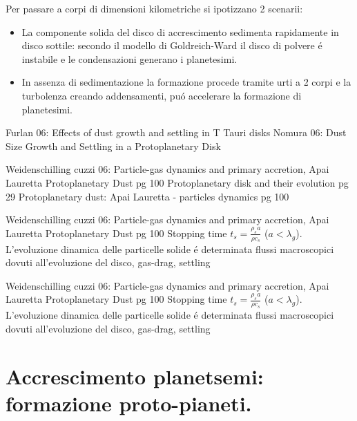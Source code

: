 \begin{workout}
Per passare a corpi di dimensioni kilometriche si ipotizzano 2 scenarii:
\begin{itemize}
\item La componente solida del disco di accrescimento sedimenta rapidamente in disco sottile: secondo il modello di Goldreich-Ward il disco di polvere \'e instabile e le condensazioni generano i planetesimi.
\item In assenza di sedimentazione la formazione procede tramite urti a 2 corpi e la turbolenza creando addensamenti, pu\'o accelerare la formazione di planetesimi.
\end{itemize}

\begin{workout}
Furlan 06: Effects of dust growth and settling in T Tauri disks
Nomura 06: Dust Size Growth and Settling in a Protoplanetary Disk
\cite{lissauer1993planet}
 \end{workout}

\begin{workout}
Weidenschilling cuzzi 06: Particle-gas dynamics and primary accretion, Apai Lauretta Protoplanetary Dust pg 100
Protoplanetary disk and their evolution pg 29
Protoplanetary dust: Apai Lauretta - particles dynamics pg 100
\end{workout}

\begin{workout}
Weidenschilling cuzzi 06: Particle-gas dynamics and primary accretion, Apai Lauretta Protoplanetary Dust pg 100
Stopping time $t_s=\frac{\rho_sa}{\rho c_s}$ ($a<\lambda_g$). L'evoluzione dinamica delle particelle solide \'e determinata flussi macroscopici dovuti all'evoluzione del disco, gas-drag, settling
\end{workout}

\begin{workout}
Weidenschilling cuzzi 06: Particle-gas dynamics and primary accretion, Apai Lauretta Protoplanetary Dust pg 100
Stopping time $t_s=\frac{\rho_sa}{\rho c_s}$ ($a<\lambda_g$). L'evoluzione dinamica delle particelle solide \'e determinata flussi macroscopici dovuti all'evoluzione del disco, gas-drag, settling
\end{workout}

\section{Accrescimento planetsemi: formazione proto-pianeti.}



\end{workout}
